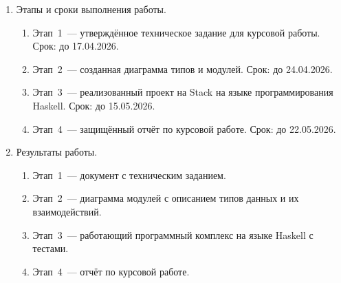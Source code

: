 \begin{enumerate}
\begin{enumerate}[label=\alph*.]
        стандартные средства, существующие библиотечные решения.
    \end{enumerate}
    \item Этапы и сроки выполнения работы.
    \begin{enumerate}[label=\alph*.]
        \item Этап~1~--- утверждённое техническое задание для курсовой работы. Срок: до 17.04.2026.
        \item Этап~2~--- созданная диаграмма типов и модулей. Срок: до 24.04.2026.
        \item Этап~3~--- реализованный проект на Stack на языке программирования Haskell. Срок: до 15.05.2026.
        \item Этап~4~--- защищённый отчёт по курсовой работе. Срок: до 22.05.2026.
        
    \end{enumerate}
    \item Результаты работы.
    \begin{enumerate}[label=\alph*.]
        \item Этап~1~--- документ с техническим заданием.
        \item Этап~2~--- диаграмма модулей с описанием типов данных и их взаимодействий.
        \item Этап~3~--- работающий программный комплекс на языке Haskell с тестами.
        \item Этап~4~--- отчёт по курсовой работе.
    \end{enumerate}
\end{enumerate}
